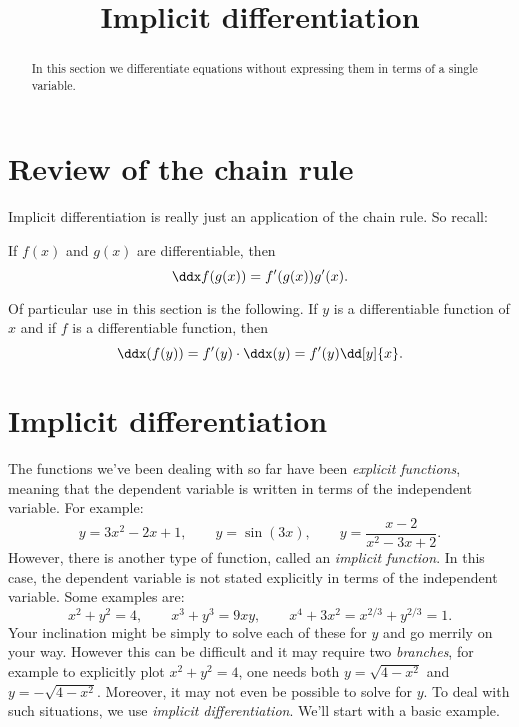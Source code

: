 \documentclass{ximera}
\title[Dig-In:]{Implicit differentiation}
\begin{document}
\begin{abstract}
In this section we differentiate equations without expressing them in
terms of a single variable.
\end{abstract}
\maketitle

\section{Review of the chain rule}

Implicit differentiation is really just an application of the chain rule.
So recall:

\begin{theorem}
If $f(x)$ and $g(x)$ are differentiable, then
\[
\ddx f(g(x)) = f'(g(x))g'(x).
\]
\end{theorem}

Of particular use in this section is the following.  
If $y$ is a differentiable function of $x$ and if $f$ is a differentiable function, then
\[
\ddx (f(y)) = f'(y) \cdot \ddx (y) = f'(y) \dd[y]{x}.
\]

\section{Implicit differentiation}

The functions we've been dealing with so far have been
\textit{explicit functions}, meaning that the
dependent variable is written in terms of the independent
variable. For example:
\[
y=3x^2-2x+1,\qquad y=\sin(3x), \qquad y = \frac{x-2}{x^2-3x+2}.
\]
However, there is another type of function, called an \textit{implicit
  function}. In this case, the dependent variable is not stated
explicitly in terms of the independent variable. Some examples are:
\[
x^2+y^2 = 4,\qquad x^3+y^3 = 9xy, \qquad x^4+3x^2 = x^{2/3}+y^{2/3} = 1.
\]
Your inclination might be simply to solve each of these for $y$ and go
merrily on your way. However this can be difficult and it may require
two \textit{branches}, for example to explicitly plot $x^2+y^2 = 4$,
one needs both $y= \sqrt{4-x^2}$ and $y=-\sqrt{4-x^2}$. Moreover, it
may not even be possible to solve for $y$. To deal with such
situations, we use \textit{implicit
  differentiation}. We'll start with a basic example.
\end{document}
